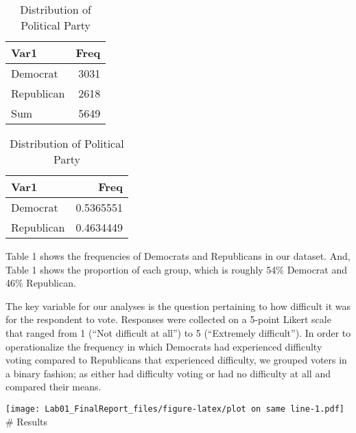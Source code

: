 \documentclass[
]{article}
\newenvironment{Shaded}{\begin{snugshade}}{\end{snugshade}}
\newcommand{\KeywordTok}[1]{\textcolor[rgb]{0.13,0.29,0.53}{\textbf{#1}}}
\newcommand{\NormalTok}[1]{#1}
\newcommand{\OperatorTok}[1]{\textcolor[rgb]{0.81,0.36,0.00}{\textbf{#1}}}
\newcommand{\StringTok}[1]{\textcolor[rgb]{0.31,0.60,0.02}{#1}}
\begin{document}
\begin{table}[!htb]
    \begin{minipage}{.5\linewidth}
      \caption{}
      \centering \begin{table}

\caption{\label{tab:Table}Frequency Distribution of Political Party}
\centering
\begin{tabular}[t]{lr}
\toprule
Var1 & Freq\\
\midrule
Democrat & 3031\\
Republican & 2618\\
Sum & 5649\\
\bottomrule
\end{tabular}
\end{table} \end{minipage}%
    \begin{minipage}{.5\linewidth}
      \centering
        \caption{} \begin{table}

\caption{\label{tab:Table}Distribution of Political Party}
\centering
\begin{tabular}[t]{lr}
\toprule
Var1 & Freq\\
\midrule
Democrat & 0.5365551\\
Republican & 0.4634449\\
\bottomrule
\end{tabular}
\end{table} \end{minipage} 
\end{table}

Table 1 shows the frequencies of Democrats and Republicans in our dataset. And, Table 1 shows the proportion of each group, which is roughly 54\% Democrat and 46\% Republican.

The key variable for our analyses is the question pertaining to how difficult it was for the respondent to vote. Responses were collected on a 5-point Likert scale that ranged from 1 (``Not difficult at all'') to 5 (``Extremely difficult''). In order to operationalize the frequency in which Democrats had experienced difficulty voting compared to Republicans that experienced difficulty, we grouped voters in a binary fashion; as either had difficulty voting or had no difficulty at all and compared their means.

\texttt{[image: Lab01\_FinalReport\_files/figure-latex/plot on same line-1.pdf]}
\# Results

\begin{Shaded}
\end{Shaded}
\end{document}
